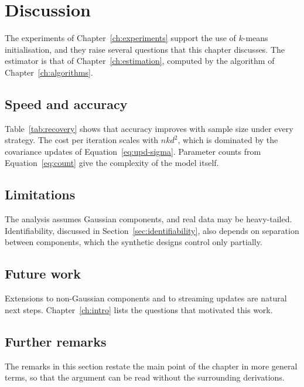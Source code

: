 \chapter{Discussion}\label{ch:discussion}

The experiments of Chapter~\ref{ch:experiments} support the use of
$k$-means initialisation, and they raise several questions that this chapter
discusses. The estimator is that of Chapter~\ref{ch:estimation}, computed by
the algorithm of Chapter~\ref{ch:algorithms}.

\section{Speed and accuracy}\label{sec:discussion-speed}

Table~\ref{tab:recovery} shows that accuracy improves with sample size under
every strategy. The cost per iteration scales with $nkd^2$, which is dominated
by the covariance updates of Equation~\eqref{eq:upd-sigma}. Parameter counts from
Equation~\eqref{eq:count} give the complexity of the model itself.

\lipsum[41-42]

\section{Limitations}\label{sec:limitations}

The analysis assumes Gaussian components, and real data may be heavy-tailed.
Identifiability, discussed in Section~\ref{sec:identifiability}, also depends on
separation between components, which the synthetic designs control only
partially.

\lipsum[43-44]

\section{Future work}\label{sec:future}

Extensions to non-Gaussian components and to streaming updates are natural next
steps. Chapter~\ref{ch:intro} lists the questions that motivated this work.

\lipsum[45-46]

\section{Further remarks}\label{sec:further-discussion}

The remarks in this section restate the main point of the chapter in more
general terms, so that the argument can be read without the surrounding
derivations.

\lipsum[123-134]
